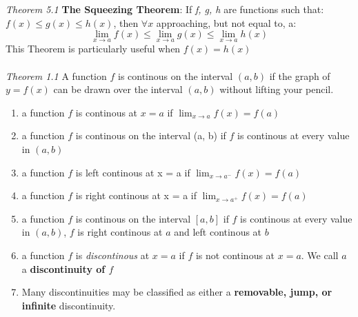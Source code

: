 \documentclass{book}
\begin{document}
\noindent \emph{Theorem 5.1} \textbf{The Squeezing Theorem}: If \emph{f, g, h} are functions such that: $f(x) \leq g(x) \leq h(x)$, then $\forall x$ approaching, but not equal to, a:
$$ \lim_{x \to a}f(x) \leq \lim_{x \to a}g(x) \leq \lim_{x \to a}h(x) $$
This Theorem is particularly useful when $f(x) = h(x)$\\ \\

\noindent \emph{Theorem 1.1} A function $f$ is continous on the interval $(a,b)$ if the graph of $y=f(x)$ can be drawn over the interval $(a,b)$ without lifting your pencil.
\begin{enumerate}
	\item a function $f$ is continous at $x = a$ if $\lim_{x \to a} f(x) = f(a)$
	\item a function $f$ is continous on the interval (a, b) if $f$ is continous at every value in $(a, b)$
	\item a function $f$ is left continous at x = a if $\lim_{x \to a^-} f(x) = f(a)$
	\item a function $f$ is right continous at x = a if $\lim_{x \to a^+} f(x) = f(a)$
	\item a function $f$ is continous on the interval $[a, b]$ if $f$ is continous at every value in $(a, b)$, $f$ is right continous at $a$ and left continous at $b$
	\item a function $f$ is \emph{discontinous} at $x = a$ if $f$ is not continous at $x = a$. We call $a$ a \textbf{discontinuity of $f$}
	\item Many discontinuities may be classified as either a \textbf{removable, jump, or infinite} discontinuity.
\end{enumerate}
\end{document}
